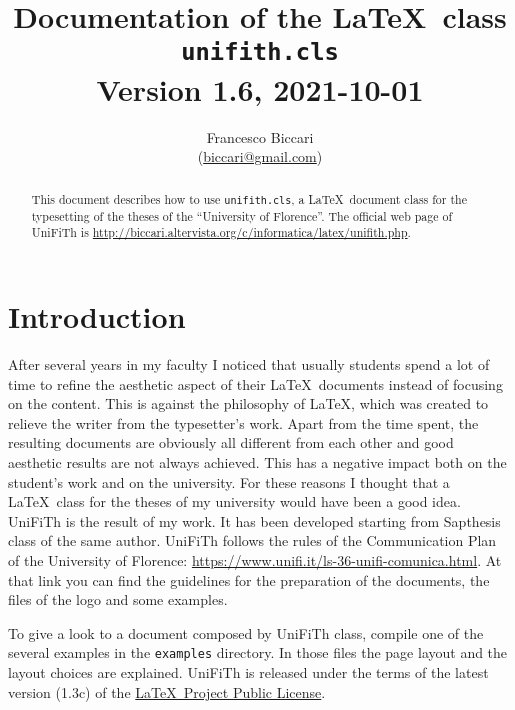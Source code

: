 \documentclass[a5paper,11pt]{article}
\author{\small Francesco Biccari\\\small(\href{mailto:biccari@gmail.com}{biccari@gmail.com})}
\title{\small Documentation of the \LaTeX\ class\\
		\Large \textbf{\texttt{unifith.cls}}\\
		\small \vspace{0.2cm} Version 1.6, 2021-10-01
}
\date{}
\begin{document}
\maketitle

\begin{abstract}\noindent
This document describes how to use \texttt{unifith.cls}, a \LaTeX\ document class for the typesetting of the theses of the ``University of Florence''. The official web page of \textsf{UniFiTh} is {\footnotesize\url{http://biccari.altervista.org/c/informatica/latex/unifith.php}}.
\end{abstract}

\setcounter{tocdepth}{2}
\renewcommand{\columnseprule}{0.4pt}
\setlength{\columnsep}{1.5cm}

{\small
\tableofcontents}

\clearpage

\section{Introduction}

After several years in my faculty I noticed that usually students spend a lot of time to refine the aesthetic aspect of their \LaTeX\ documents instead of focusing on the content.
This is against the philosophy of \LaTeX, which was created to relieve the writer from the typesetter's work.
Apart from the time spent, the resulting documents are obviously all different from each other and good aesthetic results are not always achieved.
This has a negative impact both on the student's work and on the university.
For these reasons I thought that a \LaTeX\ class for the theses of my 
university would have been a good idea.
\textsf{UniFiTh} is the result of my work.
It has been developed starting from \textsf{Sapthesis} class of the same author. \textsf{UniFiTh} follows the rules of the Communication Plan of the University of Florence: {\footnotesize\url{https://www.unifi.it/ls-36-unifi-comunica.html}}. At that link you can find the guidelines for the preparation of the documents, the files of the logo and some examples. 

To give a look to a document composed by \textsf{UniFiTh} class, compile one of the several examples in the \texttt{examples} directory.
In those files the page layout and the layout choices are explained.
\textsf{UniFiTh} is released under the terms of the latest version (1.3c) of the 
\href{http://www.latex-project.org/lppl/}{\LaTeX\ Project Public License}.
\end{document}
